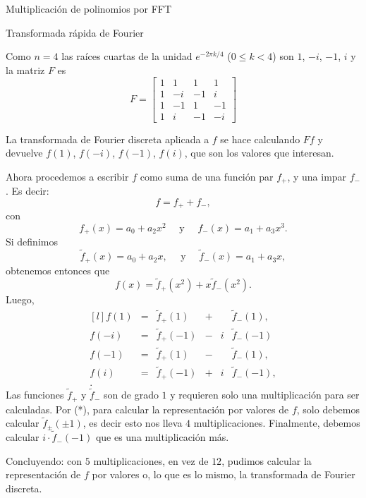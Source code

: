 \begin{chapter}{Multiplicación de polinomios por FFT}
\begin{section}{Transformada rápida de Fourier}
\begin{ejemplo*}
      Como $n=4$ las raíces cuartas de la unidad $e^{-2\pi k/4}$ ($0 \le k < 4$) son $1$, $-i$, $-1$, $i$ y la matriz $F$  es
      \begin{equation*}
          F=\begin{bmatrix}
              1 & 1  & 1  & 1  \\
              1 & -i & -1 & i  \\
              1 & -1 & 1  & -1 \\
              1 & i  & -1 & -i
          \end{bmatrix}
      \end{equation*}

      La transformada de Fourier discreta aplicada a $f$ se hace calculando $Ff$ y  devuelve  $f(1)$, $f(-i)$, $f(-1)$, $f(i)$,  que son los valores que interesan.

      Ahora procedemos a escribir  $f $ como suma de una función par $f_+$, y una impar $f_-$. Es decir:
      $$
          f = f_+ + f_-,$$
      con
      $$ f_+(x) = a_0 + a_2x^2 \quad  \text{ y } \quad f_-(x) = a_1 + a_3x^3.
      $$
      Si definimos
      $$
          \tilde{f}_+(x) = a_0 + a_2 x, \quad \text{ y } \quad \tilde{f}_-(x) = a_1 + a_3 x,
      $$
      obtenemos entonces que
      \begin{equation*}
          f(x) = \tilde{f}_+(x^2) + x \tilde{f}_-(x^2).
      \end{equation*}
      Luego,
      \begin{equation}
          \begin{matrix*}[l]
              f(1) &=& \tilde{f}_+(1)& + & &\tilde{f}_-(1), \\
              f(-i) &=& \tilde{f}_+(-1) &-&i & \tilde{f}_-(-1)\\
              f(-1) &=& \tilde{f}_+(1)& -&  &\tilde{f}_-(1), \\
              f(i) &=& \tilde{f}_+(-1)& +&  i&\tilde{f}_-(-1), \\.
          \end{matrix*} \tag{*}
      \end{equation}
      Las funciones $\tilde{f}_+$ y $\tilde{f}_-$ son de grado $1$ y requieren solo una multiplicación para ser calculadas. Por (*), para calcular la representación por valores de $f$, solo debemos calcular $\tilde{f}_\pm(\pm1)$,  es decir esto nos lleva $4$ multiplicaciones. Finalmente,  debemos  calcular $ i \cdot \tilde{f}_-(-1)$  que es una multiplicación más.

      Concluyendo: con $5$ multiplicaciones,  en vez de $12$, pudimos calcular la representación de $f$ por valores o, lo que es lo mismo, la transformada de Fourier discreta.
  \end{ejemplo*}


\end{section}
\end{chapter}
